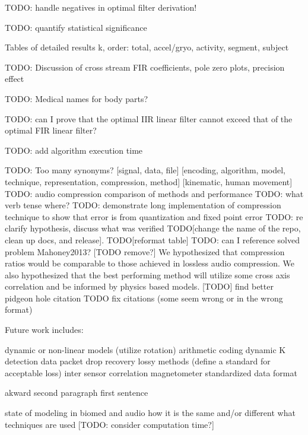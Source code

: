 \documentclass[journal]{IEEEtran}
\begin{document}
TODO: handle negatives in optimal filter derivation!

TODO: quantify statistical significance

Tables of detailed results k, order: total, accel/gryo, activity, segment, subject 

TODO: Discussion of cross stream FIR coefficients, pole zero plots, precision effect

TODO: Medical names for body parts?

TODO: can I prove that the optimal IIR linear filter cannot exceed that of the optimal FIR linear filter?

TODO: add algorithm execution time

TODO: Too many synonyms? [signal, data, file] [encoding, algorithm, model, technique, representation, compression, method] [kinematic, human movement]
TODO: audio compression comparison of methods and performance
TODO: what verb tense where?
TODO: demonstrate long implementation of compression technique to show that error is from quantization and fixed point error
TODO: re clarify hypothesis, discuss what was verified
TODO[change the name of the repo, clean up docs, and release]. 
TODO[reformat table]
TODO: can I reference solved problem Mahoney2013?
[TODO remove?]  We hypothesized that compression ratios would be comparable to those achieved in lossless audio compression. We also hypothesized that the best performing method will utilize some cross axis correlation and be informed by physics based models.
[TODO] find better pidgeon hole citation
TODO fix citations (some seem wrong or in the wrong format)

Future work includes:

dynamic or non-linear models (utilize rotation)
arithmetic coding
dynamic K detection
data packet drop recovery
lossy methods (define a standard for acceptable loss)
inter sensor correlation
magnetometer
standardized data format

akward second paragraph first sentence

state of modeling in biomed and audio
how it is the same and/or different
what techniques are used
[TODO: consider computation time?]
\end{document}
